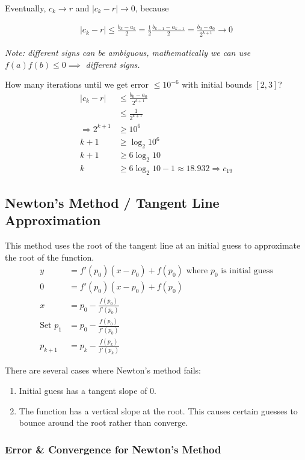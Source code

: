 \documentclass[12pt, letterpaper]{article}
\begin{document}
\noindent Eventually, $c_k \rightarrow r$ and $|c_k-r|\rightarrow 0$, because 

\begin{align*}
    |c_k-r|\le \frac{b_k-a_k}{2}=\frac 12 \frac{b_{k-1}-a_{k-1}}{2}=
    \frac{b_0-a_0}{2^{k+1}} \rightarrow 0
\end{align*} 

\textit{Note: different signs can be ambiguous, mathematically we can use } $f(a)f(b)\le 0\implies $ \textit{different signs.}

\newpage
{} How many iterations until we get error $\le 10^{-6}$ with initial bounds $[2,3]$?
\begin{align*}
    |c_k-r| &\le \frac{b_0-a_0}{2^{k+1}} \\
    &\le \frac{1}{2^{k+1}} \\
    \Rightarrow 2^{k+1}&\ge 10^6 \\
    k+1 &\ge \log_2 10^6 \\
    k+1 &\ge 6\log_2 10 \\
    k &\ge 6\log_2 10 - 1 \approx 18.932 \Rightarrow c_{19}
\end{align*}

\subsection{Newton's Method / Tangent Line Approximation}
This method uses the root of the tangent line at an initial guess to approximate the root of the function.
\begin{align*}
    y &= f'(p_0)(x-p_0)+f(p_0) \text{ where } p_0 \text{ is initial guess} \\
    0 &= f'(p_0)(x-p_0)+f(p_0) \\
    x &= p_0 - \frac{f(p_0)}{f'(p_0)} \\
    \text {Set } p_1 &= p_0 - \frac{f(p_0)}{f'(p_0)} \\
    p_{k+1} &= p_k - \frac{f(p_k)}{f'(p_k)}
\end{align*}

\noindent There are several cases where Newton's method fails:
\begin{enumerate}
    \item Initial guess has a tangent slope of 0.
    \item The function has a vertical slope at the root. This causes certain guesses to bounce around the root rather than converge.
\end{enumerate}

\subsubsection{Error \& Convergence for Newton's Method}
\end{document}
